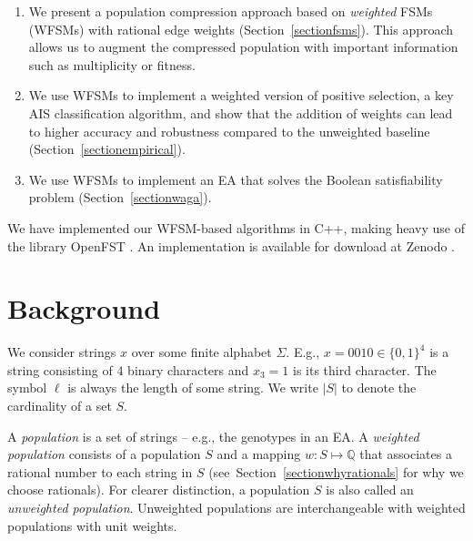 \documentclass{llncs}
\begin{document}
\begin{enumerate}
\item We present a population compression approach based on \emph{weighted} FSMs (WFSMs) with rational
edge weights (Section~\ref{sectionfsms}). This approach allows us to augment the compressed population with important information such as multiplicity or fitness. 
\item We use WFSMs to implement a weighted version of positive selection, a key AIS classification algorithm, and show that the addition of weights can lead to higher accuracy and robustness compared to the unweighted baseline (Section~\ref{sectionempirical}).
\item We use WFSMs to implement an EA that solves the Boolean satisfiability problem (Section~\ref{sectionwaga}).

\end{enumerate}


We have implemented our WFSM-based algorithms in C++, making heavy use of the library OpenFST \cite{openfst}. An implementation is available for download at Zenodo \cite{CodeForPaper}.

\section{Background}

\label{sectionbackground}

We consider strings $x$ over some finite alphabet $\Sigma$.
E.g., $x=0010 \in \{0,1\}^4$ is a string consisting of 4 binary characters and $x_3=1$ is its third character.
The symbol $\ell$ is always the length of some string.
We write $|S|$ to denote the cardinality of a set $S$.

A \emph{population} is a set of strings -- e.g., the genotypes in an EA.
A \emph{weighted population} consists of a population $S$ and a mapping $w : S \mapsto \mathbb{Q}$ that associates a rational number to each string in $S$ (see~Section~\ref{sectionwhyrationals} for why we choose rationals).
For clearer distinction, a population $S$ is also called an \emph{unweighted population}.
Unweighted populations are interchangeable with weighted populations with unit weights.
\end{document}
